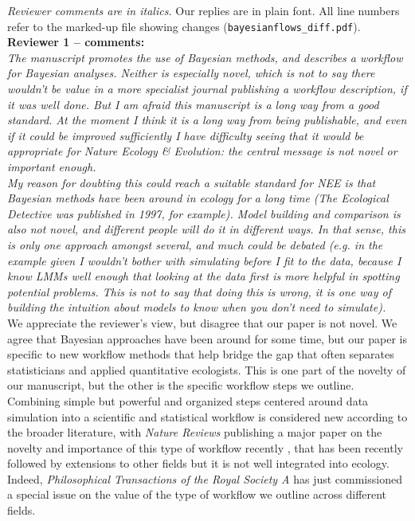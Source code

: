 \documentclass[11pt,a4paper]{article}
\begin{document}
%



\emph{Reviewer comments are in italics.} Our replies are in plain font. All line numbers refer to the marked-up file showing changes (\verb|bayesianflows_diff.pdf|).\\


{\bf Reviewer 1 -- comments:} \\

\emph{The manuscript promotes the use of Bayesian methods, and describes a workflow for Bayesian analyses. Neither is especially novel, which is not to say there wouldn't be value in a more specialist journal publishing a workflow description, if it was well done. But I am afraid this manuscript is a long way from a good standard. At the moment I think it is a long way from being publishable, and even if it could be improved sufficiently I have difficulty seeing that it would be appropriate for Nature Ecology \& Evolution: the central message is not novel or important enough.}\\

\emph{My reason for doubting this could reach a suitable standard for NEE is that Bayesian methods have been around in ecology for a long time (The Ecological Detective was published in 1997, for example). Model building and comparison is also not novel, and different people will do it in different ways. In that sense, this is only one approach amongst several, and much could be debated (e.g. in the example given I wouldn't bother with simulating before I fit to the data, because I know LMMs well enough that looking at the data first is more helpful in spotting potential problems. This is not to say that doing this is wrong, it is one way of building the intuition about models to know when you don't need to simulate).}\\

We appreciate the reviewer's view, but disagree that our paper is not novel. We agree that Bayesian approaches have been around for some time, but our paper is specific to new workflow methods that help bridge the gap that often separates statisticians and applied quantitative ecologists. This is one part of the novelty of our manuscript, but the other is the specific workflow steps we outline. Combining simple but powerful and organized steps centered around data simulation into a scientific and statistical workflow is considered new according to the broader literature, with \emph{Nature Reviews} publishing a major paper on the novelty and importance of this type of workflow recently \citep[][though the workflow we outline is distinct from this one]{vandeschoot2021}, that has been recently followed by extensions to other fields \citep[for example in epidimeology, veterinary and cognitive sciences,][]{grinsztajn2021,schad2021,mielke2023workflow,hess2024bayesian} but it is not well integrated into ecology. Indeed, \emph{Philosophical Transactions of the Royal Society A} has just commissioned a special issue on the value of the type of workflow we outline across different fields. \\
\end{document}
